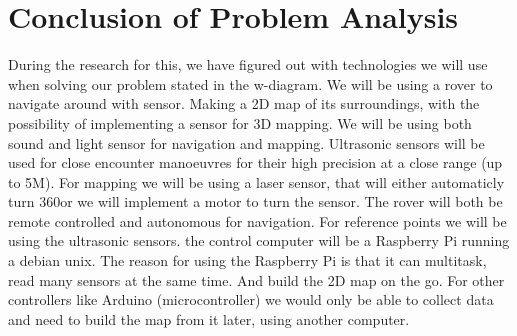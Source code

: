 \section{Conclusion of Problem Analysis}

During the research for this, we have figured out with technologies we will use when solving our problem stated in the w-diagram.
We will be using a rover to navigate around with sensor. Making a 2D map of its surroundings, with the possibility of implementing a sensor for 3D mapping. We will be using both sound and light sensor for navigation and mapping. Ultrasonic sensors will be used for close encounter manoeuvres for their high precision at a close range (up to 5M). For mapping we will be using a laser sensor, that will either automaticly turn 360\deg or we will implement a motor to turn the sensor.
The rover will both be remote controlled and autonomous for navigation. For reference points we will be using the ultrasonic sensors. the control computer will be a Raspberry Pi running a debian unix. The reason for using the Raspberry Pi is that it can multitask, read many sensors at the same time. And build the 2D map on the go. For other controllers like Arduino (microcontroller) we would only be able to collect data and need to build the map from it later, using another computer.  



\clearpage
